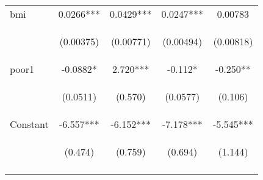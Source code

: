 \documentclass[]{article}
\begin{document}
\begin{center}
\begin{tabular}{lcccc}
bmi & 0.0266*** & 0.0429*** & 0.0247*** & 0.00783 \\
\vspace{4pt} & \begin{footnotesize}(0.00375)\end{footnotesize} & \begin{footnotesize}(0.00771)\end{footnotesize} & \begin{footnotesize}(0.00494)\end{footnotesize} & \begin{footnotesize}(0.00818)\end{footnotesize} \\
poor1 & -0.0882* & 2.720*** & -0.112* & -0.250** \\
\vspace{4pt} & \begin{footnotesize}(0.0511)\end{footnotesize} & \begin{footnotesize}(0.570)\end{footnotesize} & \begin{footnotesize}(0.0577)\end{footnotesize} & \begin{footnotesize}(0.106)\end{footnotesize} \\
Constant & -6.557*** & -6.152*** & -7.178*** & -5.545*** \\
 & \begin{footnotesize}(0.474)\end{footnotesize} & \begin{footnotesize}(0.759)\end{footnotesize} & \begin{footnotesize}(0.694)\end{footnotesize} & \begin{footnotesize}(1.144)\end{footnotesize} \\
\vspace{4pt} & \begin{footnotesize}\end{footnotesize} & \begin{footnotesize}\end{footnotesize} & \begin{footnotesize}\end{footnotesize} & \begin{footnotesize}\end{footnotesize} \\

\end{tabular}
\end{center}
\end{document}
